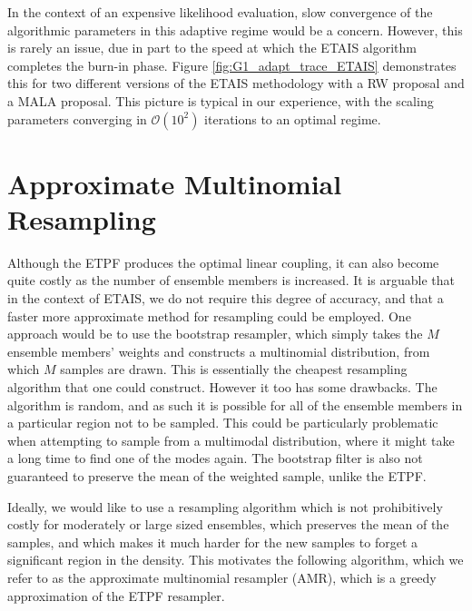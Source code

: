 \documentclass[final]{siamltex}
\begin{document}
In the context of an expensive likelihood evaluation, slow convergence
of the algorithmic parameters in this adaptive regime would be a
concern. However, this is rarely an issue, due in part to the speed at
which the ETAIS algorithm completes the burn-in phase. Figure
\ref{fig:G1_adapt_trace_ETAIS} demonstrates this for two different
versions of the ETAIS methodology with a RW proposal and a MALA\cite{roberts1998optimal}
proposal. This picture is typical in our experience, with the scaling
parameters converging in $\mathcal{O}(10^2)$ iterations to an optimal regime.

\section{Approximate Multinomial Resampling}\label{sec:AMR}

Although the ETPF produces the optimal linear coupling, it can also become quite costly as the number of ensemble members
is increased. It is arguable that in the context of ETAIS, we do not
require this degree of accuracy, and that a faster more approximate
method for resampling could be employed. One approach would be to use
the bootstrap resampler, which simply takes the $M$ ensemble members'
weights and constructs a multinomial distribution, from which $M$
samples are drawn. This is essentially the cheapest resampling
algorithm that one could construct. However it too has some
drawbacks. The algorithm is random, and as such it is possible for all
of the ensemble members in a particular region not to be sampled. This
could be particularly problematic when attempting to sample from a
multimodal distribution, where it might take a long time to find one
of the modes again. The bootstrap filter is also not guaranteed to
preserve the mean of the weighted sample, unlike the ETPF.

Ideally, we would like to use a resampling algorithm which is not
prohibitively costly for moderately or large sized ensembles,
which preserves the mean of the samples, and which makes it much
harder for the new samples to forget a significant region in the
density. This motivates the following algorithm, which we refer to as the
approximate multinomial resampler (AMR), which is a greedy
approximation of the ETPF resampler.
\end{document}
